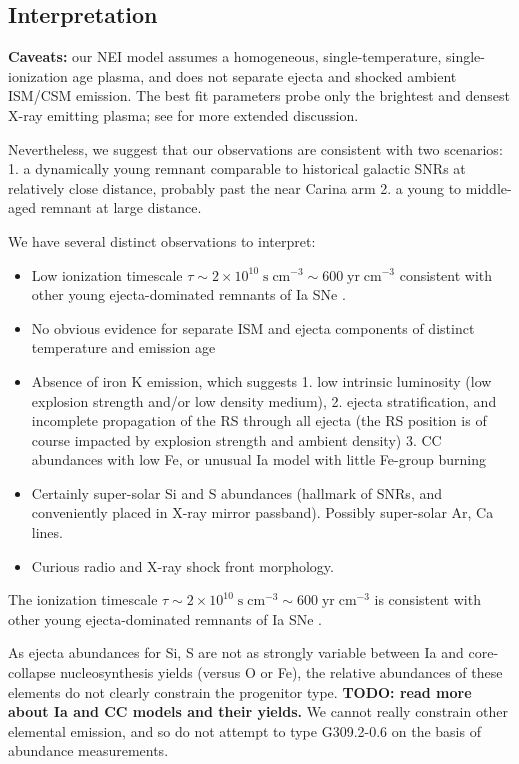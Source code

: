 \documentclass[preprint2,tighten,trackchanges]{aastex6}
\newcommand*{\mt}{\mathrm}
\newcommand*{\unit}[1]{\;\mt{#1}}  %
\newcommand*{\TauUnits}{\unit{s\;cm^{-3}}}
\begin{document}
\subsection{Interpretation}

\textbf{Caveats:} our NEI model assumes a homogeneous, single-temperature,
single-ionization age plasma, and does not separate ejecta and shocked ambient
ISM/CSM emission.
The best fit parameters probe only the brightest and densest X-ray emitting
plasma; see \citet{rakowski2006-g337} for more extended discussion.

Nevertheless, we suggest that our observations are consistent with two
scenarios:
1. a dynamically young remnant comparable to historical galactic SNRs at
relatively close distance, probably past the near Carina arm
2. a young to middle-aged remnant at large distance.

We have several distinct observations to interpret:
\begin{itemize}
    \item Low ionization timescale
        $\tau \sim 2 \times 10^{10} \TauUnits \sim 600 \unit{yr\;cm^{-3}}$
        consistent with other young ejecta-dominated remnants of Ia SNe
        \citep[][Table 4]{badenes2007}.
    \item No obvious evidence for separate ISM and ejecta components of
        distinct temperature and emission age
    \item Absence of iron K emission, which
        suggests
        1. low intrinsic luminosity (low explosion strength and/or low density
           medium),
        2. ejecta stratification, and incomplete propagation of the RS through
           all ejecta (the RS position is of course impacted by explosion strength
           and ambient density)
        3. CC abundances with low Fe, or unusual Ia model with little Fe-group
           burning
   \item Certainly super-solar Si and S abundances (hallmark of SNRs, and
       conveniently placed in X-ray mirror passband).
       Possibly super-solar Ar, Ca lines.
    \item Curious radio and X-ray shock front morphology.
\end{itemize}

The ionization timescale
$\tau \sim 2 \times 10^{10} \TauUnits \sim 600 \unit{yr\;cm^{-3}}$
is consistent with other young ejecta-dominated remnants of Ia SNe
\citep[][Table 4]{badenes2007}.

As ejecta abundances for Si, S are not as strongly variable between Ia and
core-collapse nucleosynthesis yields (versus O or Fe), the relative abundances
of these elements do not clearly constrain the progenitor type.
\textbf{TODO: read more about Ia and CC models and their yields.}
We cannot really constrain other elemental emission, and so do not attempt to
type G309.2-0.6 on the basis of abundance measurements.
\end{document}
